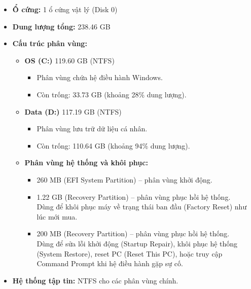 \begin{itemize}
    \item \textbf{Ổ cứng:} 1 ổ cứng vật lý (Disk 0)
    \item \textbf{Dung lượng tổng:} 238.46 GB
    \item \textbf{Cấu trúc phân vùng:}
    \begin{itemize}
        \item \textbf{OS (C:)} 119.60 GB (NTFS)
        \begin{itemize}
            \item Phân vùng chứa hệ điều hành Windows.
            \item Còn trống: 33.73 GB (khoảng 28\% dung lượng).
        \end{itemize}
        \item \textbf{Data (D:)} 117.19 GB (NTFS)
        \begin{itemize}
            \item Phân vùng lưu trữ dữ liệu cá nhân.
            \item Còn trống: 110.64 GB (khoảng 94\% dung lượng).
        \end{itemize}
        \item \textbf{Phân vùng hệ thống và khôi phục:}
        \begin{itemize}
            \item 260 MB (EFI System Partition) -- phân vùng khởi động.
            \item 1.22 GB (Recovery Partition) -- phân vùng phục hồi hệ thống.\\Dùng để khôi phục máy về trạng thái ban đầu (Factory Reset) như lúc mới mua.
            \item 200 MB (Recovery Partition) -- phân vùng phục hồi hệ thống.\\Dùng để sửa lỗi khởi động (Startup Repair), khôi phục hệ thống (System Restore), reset PC (Reset This PC), hoặc truy cập Command Prompt khi hệ điều hành gặp sự cố.
        \end{itemize}
    \end{itemize}
    \item \textbf{Hệ thống tập tin:} NTFS cho các phân vùng chính.
\end{itemize}

\begin{center}
\end{center}


